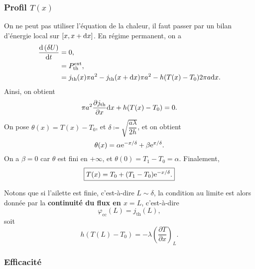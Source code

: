         \subsubsection{Profil $T(x)$}

            On ne peut pas utiliser l'équation de la chaleur, il faut passer par un bilan d'énergie local sur $[x,x+\mathrm{d} x]$. En régime permanent, on a 
            \begin{align}
                \frac{\mathrm{d}\left(\delta U\right)}{\mathrm{d} t}
                &=
                0,\\
                &=
                P_{\text{th}}^{\text{ext}},\\
                &=
                j_{\text{th}}(x)\pi a^{2}-j_{\text{th}}(x+\mathrm{d} x)\pi a^{2}-h(T(x)-T_0)2\pi a\mathrm{d} x.
            \end{align}
            Ainsi, on obtient
            \begin{equation}
                \pi a^{2}\frac{\partial j_{\text{th}}}{\partial x}\mathrm{d} x+h(T(x)-T_0)=0.
            \end{equation}
            On pose $\theta(x)=T(x)-T_0$, et $\delta\coloneqq\sqrt{\dfrac{a\lambda}{2h}}$, et on obtient 
            \begin{equation}
                \theta(x)=\alpha\mathrm{e}^{-x/\delta}+\beta\mathrm{e}^{x/\delta}.
            \end{equation}
            On a $\beta =0$ car $\theta$ est fini en $+\infty$, et $\theta(0)=T_1-T_0=\alpha$. Finalement,
            \begin{equation}
                \boxed{
                    T(x)=T_0+(T_1-T_0)\mathrm{e}^{-x/\delta}.
                }
            \end{equation}

            Notons que si l'ailette est \og finie\fg, c'est-à-dire $L\sim\delta$, la condition au limite est alors donnée par la \textbf{continuité du flux en $x=L$}, c'est-à-dire 
            \begin{equation}
                \varphi_{\text{cc}}(L)=j_{\text{th}}(L),
            \end{equation}
            soit
            \begin{equation}
                \boxed{
                    h(T(L)-T_0)=-\lambda\left(\frac{\partial T}{\partial x}\right)_{L}.
                }
            \end{equation}

        \subsubsection{Efficacité}

